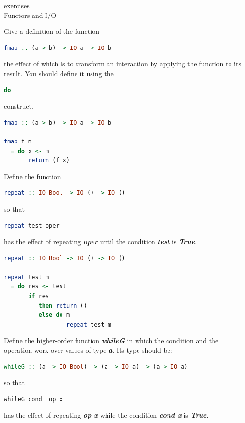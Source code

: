 \documentclass{article}
\newcommand\ExTitle{Functors and I/O}
\newcommand\fullExTitle{exercises \\ \ExTitle }
\begin{document}
\begin{Huge}
	\begin{center}
	\fullExTitle
	\end{center}
\end{Huge}

\begin{exercise}
Give a definition of the function 
\begin{lstlisting}[language=Haskell]
fmap :: (a-> b) -> IO a -> IO b
  \end{lstlisting}
the effect of which is to transform an interaction by applying the function to its result. You should define it using the 
\begin{lstlisting}[language=Haskell]
do  
\end{lstlisting}
construct.
\end{exercise}


\begin{solution}
\begin{lstlisting}[language=Haskell]
fmap :: (a-> b) -> IO a -> IO b

fmap f m
  = do x <- m
       return (f x)
  \end{lstlisting}
\end{solution}


\begin{exercise} 
Define the function 
\begin{lstlisting}[language=Haskell]
repeat :: IO Bool -> IO () -> IO ()
  \end{lstlisting}
 so that 
 \begin{lstlisting}[language=Haskell]
repeat test oper
  \end{lstlisting}
has the effect of repeating \textit{\textbf{oper}}  until the condition \textit{\textbf{test}} is \textit{\textbf{True}}.
\end{exercise}


\begin{solution}
\begin{lstlisting}[language=Haskell]
repeat :: IO Bool -> IO () -> IO ()

repeat test m
  = do res <- test
       if res 
          then return ()
          else do m
                  repeat test m
 \end{lstlisting}
 \end{solution}


\begin{exercise}
Define the higher-order function \textit{\textbf{whileG}} in which the condition and the operation work over values of type \textit{\textbf{a}}. Its type should be:
\begin{lstlisting}[language=Haskell]
whileG :: (a -> IO Bool) -> (a -> IO a) -> (a-> IO a) 
\end{lstlisting}
so that 
 \begin{lstlisting}[language=Haskell]
whileG cond  op x
  \end{lstlisting}
has the effect of repeating \textit{\textbf{op x}}  while the condition \textit{\textbf{cond x }} is \textit{\textbf{True}}.

\end{exercise} 
\end{document}

